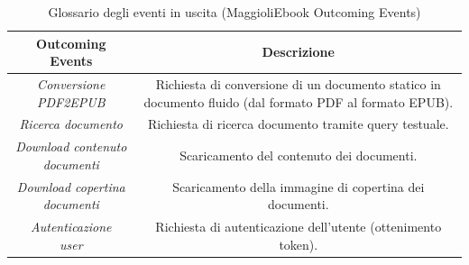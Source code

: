 \begin{table}[H]
\centering
    \begin{tabular}{|c|c|}
         \hline
         \textbf{Outcoming Events} & \textbf{Descrizione}\\
         \hline
         \specialcell{\textit{Conversione}\\\textit{PDF2EPUB}} & \specialcell{Richiesta di conversione di un documento statico in\\ documento fluido (dal formato PDF al formato EPUB).}\\
         \hline
         \textit{Ricerca documento} & Richiesta di ricerca documento tramite query testuale.\\
         \hline
         \specialcell{\textit{Download contenuto}\\\textit{documenti}} & Scaricamento del contenuto dei documenti.\\
         \hline
         \specialcell{\textit{Download copertina}\\\textit{documenti}} & Scaricamento della immagine di copertina dei documenti.\\
         \hline
         \specialcell{\textit{Autenticazione}\\\textit{user}} & Richiesta di autenticazione dell'utente (ottenimento token).\\
         \hline
    \end{tabular}
    \caption{Glossario degli eventi in uscita (MaggioliEbook Outcoming Events)}
\end{table}


